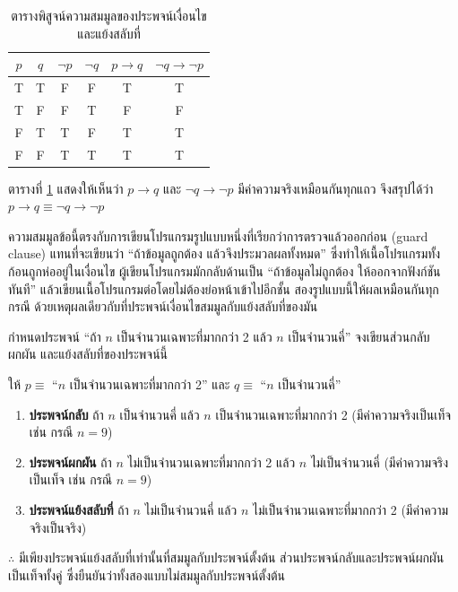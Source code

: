 \begin{table}[H]
    \centering
    \caption{ตารางพิสูจน์ความสมมูลของประพจน์เงื่อนไขและแย้งสลับที่}
    \label{tab:contrapositive}
    \begin{tabular}{|c|c|c|c|c|c|}
        \hline
        \textbf{$p$} & \textbf{$q$} & \textbf{$\neg p$} & \textbf{$\neg q$} & \textbf{$p \rightarrow q$} & \textbf{$\neg q \rightarrow \neg p$} \\ \hline
        T & T & F & F & T & T \\ \hline
        T & F & F & T & F & F \\ \hline
        F & T & T & F & T & T \\ \hline
        F & F & T & T & T & T \\ \hline
    \end{tabular}
\end{table}

ตารางที่ \ref{tab:contrapositive} แสดงให้เห็นว่า $p \rightarrow q$ และ $\neg q \rightarrow \neg p$ มีค่าความจริงเหมือนกันทุกแถว จึงสรุปได้ว่า $p \rightarrow q \equiv \neg q \rightarrow \neg p$

ความสมมูลข้อนี้ตรงกับการเขียนโปรแกรมรูปแบบหนึ่งที่เรียกว่าการตรวจแล้วออกก่อน (guard clause) แทนที่จะเขียนว่า ``ถ้าข้อมูลถูกต้อง แล้วจึงประมวลผลทั้งหมด'' ซึ่งทำให้เนื้อโปรแกรมทั้งก้อนถูกห่ออยู่ในเงื่อนไข ผู้เขียนโปรแกรมมักกลับด้านเป็น ``ถ้าข้อมูลไม่ถูกต้อง ให้ออกจากฟังก์ชันทันที'' แล้วเขียนเนื้อโปรแกรมต่อโดยไม่ต้องย่อหน้าเข้าไปอีกชั้น สองรูปแบบนี้ให้ผลเหมือนกันทุกกรณี ด้วยเหตุผลเดียวกับที่ประพจน์เงื่อนไขสมมูลกับแย้งสลับที่ของมัน

\begin{ex}
\label{ex:converse-inverse-contrapositive}
กำหนดประพจน์ ``ถ้า $n$ เป็นจำนวนเฉพาะที่มากกว่า 2 แล้ว $n$ เป็นจำนวนคี่'' จงเขียนส่วนกลับ ผกผัน และแย้งสลับที่ของประพจน์นี้
\end{ex}

\begin{solution}
ให้ $p \equiv $ ``$n$ เป็นจำนวนเฉพาะที่มากกว่า 2'' และ $q \equiv$ ``$n$ เป็นจำนวนคี่''
\begin{enumerate}
    \item \textbf{ประพจน์กลับ} ถ้า $n$ เป็นจำนวนคี่ แล้ว $n$ เป็นจำนวนเฉพาะที่มากกว่า 2 \quad (มีค่าความจริงเป็นเท็จ เช่น กรณี $n=9$)
    \item \textbf{ประพจน์ผกผัน} ถ้า $n$ ไม่เป็นจำนวนเฉพาะที่มากกว่า 2 แล้ว $n$ ไม่เป็นจำนวนคี่ \quad (มีค่าความจริงเป็นเท็จ เช่น กรณี $n=9$)
    \item \textbf{ประพจน์แย้งสลับที่} ถ้า $n$ ไม่เป็นจำนวนคี่ แล้ว $n$ ไม่เป็นจำนวนเฉพาะที่มากกว่า 2 \quad (มีค่าความจริงเป็นจริง)
\end{enumerate}
$\therefore$ มีเพียงประพจน์แย้งสลับที่เท่านั้นที่สมมูลกับประพจน์ตั้งต้น ส่วนประพจน์กลับและประพจน์ผกผันเป็นเท็จทั้งคู่ ซึ่งยืนยันว่าทั้งสองแบบไม่สมมูลกับประพจน์ตั้งต้น \solhere
\end{solution}

